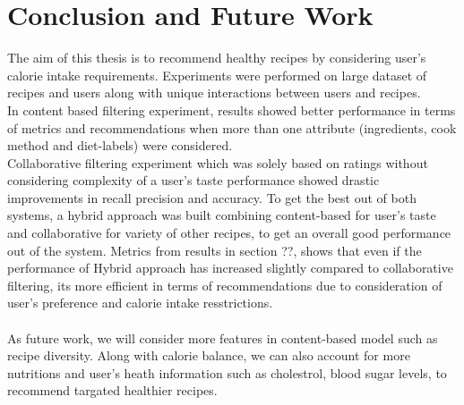 \chapter{Conclusion and Future Work}
\label{ch:conclusion}
The aim of this thesis is to recommend healthy recipes by considering user's calorie intake requirements. Experiments were performed on large dataset of recipes and users along with unique interactions between users and recipes. \\
In content based filtering experiment, results showed better performance in terms of metrics and recommendations when more than one attribute (ingredients, cook method and diet-labels) were considered. \\
Collaborative filtering experiment which was solely based on ratings without considering complexity of a user's taste performance showed drastic improvements in recall precision and accuracy.
To get the best out of both systems, a hybrid approach was built combining content-based for user's taste and collaborative for variety of other recipes, to get an overall good performance out of the system.
Metrics from results in section ??, shows that even if the performance of Hybrid approach has increased slightly compared to collaborative filtering, its more efficient in terms of recommendations due to consideration of user's preference and calorie intake resstrictions. \\
\\
As future work, we will consider more features in content-based model such as recipe diversity. Along with calorie balance, we can also account for more nutritions and user's heath information such as cholestrol, blood sugar levels, to recommend targated healthier recipes.